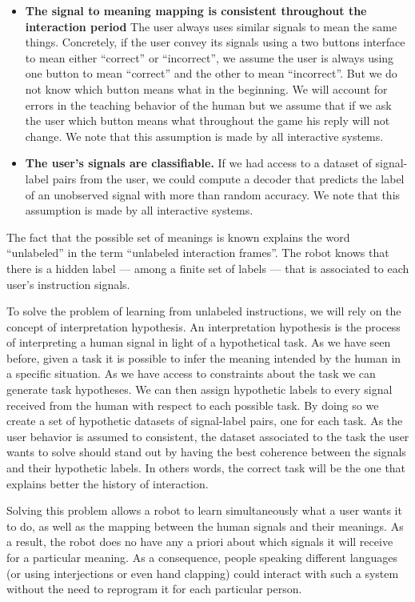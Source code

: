 \begin{itemize}
\item \textbf{The signal to meaning mapping is consistent throughout the interaction period} The user always uses similar signals to mean the same things. Concretely, if the user convey its signals using a two buttons interface to mean either ``correct'' or ``incorrect'', we assume the user is always using one button to mean ``correct'' and the other to mean ``incorrect''. But we do not know which button means what in the beginning. We will account for errors in the teaching behavior of the human but we assume that if we ask the user which button means what throughout the game his reply will not change. We note that this assumption is made by all interactive systems.

\item \textbf{The user's signals are classifiable.} If we had access to a dataset of signal-label pairs from the user, we could compute a decoder that predicts the label of an unobserved signal with more than random accuracy. We note that this assumption is made by all interactive systems.

\end{itemize}

The fact that the possible set of meanings is known explains the word ``unlabeled'' in the term ``unlabeled interaction frames''. The robot knows that there is a hidden label --- among a finite set of labels --- that is associated to each user's instruction signals.

To solve the problem of learning from unlabeled instructions, we will rely on the concept of interpretation hypothesis. An interpretation hypothesis is the process of interpreting a human signal in light of a hypothetical task. As we have seen before, given a task it is possible to infer the meaning intended by the human in a specific situation. As we have access to constraints about the task we can generate task hypotheses. We can then assign hypothetic labels to every signal received from the human with respect to each possible task. By doing so we create a set of hypothetic datasets of signal-label pairs, one for each task. As the user behavior is assumed to consistent, the dataset associated to the task the user wants to solve should stand out by having the best coherence between the signals and their hypothetic labels. In others words, the correct task will be the one that explains better the history of interaction.

Solving this problem allows a robot to learn simultaneously what a user wants it to do, as well as the mapping between the human signals and their meanings. As a result, the robot does no have any a priori about which signals it will receive for a particular meaning. As a consequence, people speaking different languages (or using interjections or even hand clapping) could interact with such a system without the need to reprogram it for each particular person.

